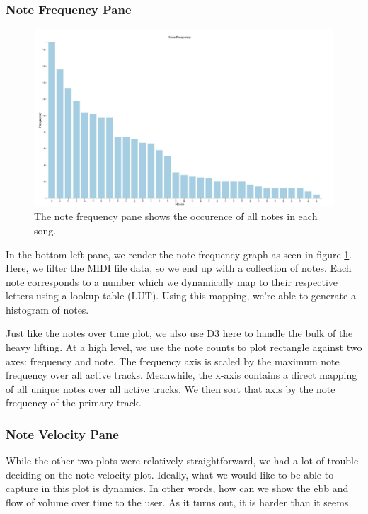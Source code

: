 \documentclass[journal]{vgtc}                %
\begin{document}
\subsubsection{Note Frequency Pane}

\begin{figure}[h]
  \centering
  \includegraphics[width=\columnwidth]{note-frequency-single-track}
  \caption{The note frequency pane shows the occurence of all notes in each song.}
  \label{fig:note-frequency}
\end{figure}

In the bottom left pane, we render the note frequency graph as seen in figure
\ref{fig:note-frequency}. Here, we filter the MIDI file data, so we end up with
a collection of notes. Each note corresponds to a number which we dynamically
map to their respective letters using a lookup table (LUT). Using this mapping,
we're able to generate a histogram of notes.

Just like the notes over time plot, we also use D3 here to handle the bulk of
the heavy lifting. At a high level, we use the note counts to plot rectangle
against two axes: frequency and note. The frequency axis is scaled by the
maximum note frequency over all active tracks. Meanwhile, the x-axis
contains a direct mapping of all unique notes over all active tracks. We then
sort that axis by the note frequency of the primary track.

\subsubsection{Note Velocity Pane}

While the other two plots were relatively straightforward, we had a lot of
trouble deciding on the note velocity plot. Ideally, what we would like to be
able to capture in this plot is dynamics. In other words, how can we show
the ebb and flow of volume over time to the user. As it turns out, it is harder
than it seems.
\end{document}
